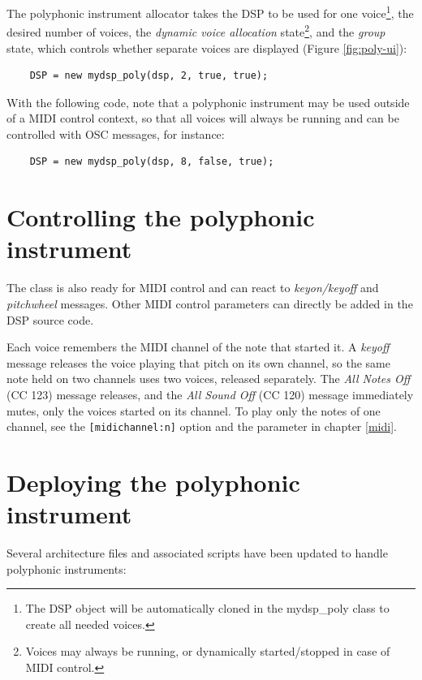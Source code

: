 The polyphonic instrument allocator takes the DSP to be used for one voice\footnote{The DSP object will be automatically cloned in the mydsp\_poly class to create all needed voices.}, the desired number of voices, the {\it dynamic voice allocation} state\footnote{Voices may always be running, or dynamically started/stopped in case of MIDI control.}, and the {\it group} state, which controls whether separate voices are displayed (Figure \ref{fig:poly-ui}): 

\footnotesize
\begin{lstlisting}
    DSP = new mydsp_poly(dsp, 2, true, true);  
\end{lstlisting}
    
\normalsize
With the following code, note that a polyphonic instrument may be used outside of a MIDI control context, so that all voices will always be running and can be controlled with OSC messages, for instance:

\footnotesize
\begin{lstlisting}
    DSP = new mydsp_poly(dsp, 8, false, true);
\end{lstlisting}

\normalsize
    
\section{Controlling the polyphonic instrument}

The  class is also ready for MIDI control and can react to {\it keyon/keyoff} and {\it pitchwheel} messages. Other MIDI control parameters can directly be added in the DSP source code. 

Each voice remembers the MIDI channel of the note that started it. A \emph{keyoff} message releases the voice playing that pitch on its own channel, so the same note held on two channels uses two voices, released separately. The \emph{All Notes Off} (CC 123) message releases, and the \emph{All Sound Off} (CC 120) message immediately mutes, only the voices started on its channel. To play only the notes of one channel, see the \lstinline'[midichannel:n]' option and the  parameter in chapter \ref{midi}.

\section{Deploying the polyphonic instrument}

Several architecture files and associated scripts have been updated to handle polyphonic instruments:

